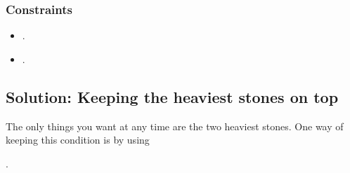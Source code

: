 \documentclass[letterpaper,12pt,english]{book}
\begin{document}
\subsubsection{Constraints}
\label{\detokenize{Priority_Queue/1046_Last_Stone_Weight:constraints}}\begin{itemize}
\item {} 
\sphinxAtStartPar
{}.

\item {} 
\sphinxAtStartPar
{}.

\end{itemize}


\subsection{Solution: Keeping the heaviest stones on top}
\label{\detokenize{Priority_Queue/1046_Last_Stone_Weight:solution-keeping-the-heaviest-stones-on-top}}
\sphinxAtStartPar
The only things you want at any time are the two heaviest stones. One way of keeping this condition is by using %
\begin{footnote}[57]\sphinxAtStartFootnote
{}
%
\end{footnote}.
\end{document}
